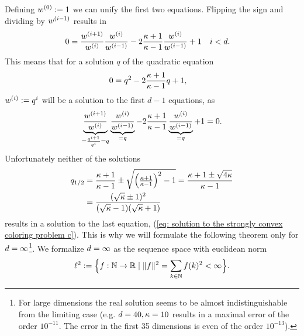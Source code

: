 Defining \(w^{(0)} :=1\) we can unify the first two equations. Flipping
the sign and dividing by \(w^{(i-1)}\) results in
\begin{align*}
	0&= 
	\frac{w^{(i+1)}}{w^{(i)}}\frac{w^{(i)}}{w^{(i-1)}}
	- 2\frac{\kappa+1}{\kappa -1}\frac{w^{(i)}}{w^{(i-1)}}
	+ 1  && i <d.
\end{align*}
%
This means that for a solution \(q\) of the quadratic equation
\begin{align}\label{eq: coloring solution quadratic equation}
	0&= q^2 - 2\frac{\kappa+1}{\kappa -1}q + 1,
\end{align}
%
\(w^{(i)} := q^i\) will be a solution to the first \(d-1\) equations, as
\begin{align*}
	\underbrace{\frac{w^{(i+1)}}{w^{(i)}}}_{=\frac{q^{i+1}}{q^i}=q}
	\underbrace{\frac{w^{(i)}}{w^{(i-1)}}}_{=q}
	- 2\frac{\kappa+1}{\kappa-1}
	\underbrace{\frac{w^{(i)}}{w^{(i-1)}}}_{=q} +1 = 0.
\end{align*}
Unfortunately neither of the solutions
%
\begin{align}\label{eq: solutions to strong convexity complexity quadratic problem}
	q_{1/2} &= \frac{\kappa+1}{\kappa -1} \pm 
	\sqrt{\left(\tfrac{\kappa+1}{\kappa-1}\right)^2 -1}
	=\frac{\kappa +1 \pm \sqrt{4\kappa}}{\kappa -1}\\
	&= \frac{(\sqrt{\kappa}\pm 1)^2}{(\sqrt{\kappa}-1)(\sqrt{\kappa}+1)}
\end{align}
%
results in a solution to the last equation, (\ref{eq: solution to the strongly
convex coloring problem c}). This is why we will formulate the following
theorem only for \(d=\infty\)\footnote{
	For large dimensions the real solution seems to be almost
	indistinguishable from the limiting case (e.g. \(d=40,
	\kappa=10\) results in a maximal error of the order \(10^{-11}\). The
	error in the first 35 dimensions is even of the order \(10^{-13}\)).
}.
We formalize \(d=\infty\) as the sequence space with euclidean norm
\begin{align*}
	\ell^{2} := \Big\{
		f:\mathbb{N} \to \mathbb{R} \mid \| f\|^2 = \sum_{k\in\mathbb{N}} f(k)^2< \infty
	\Big\}.
\end{align*}
%

